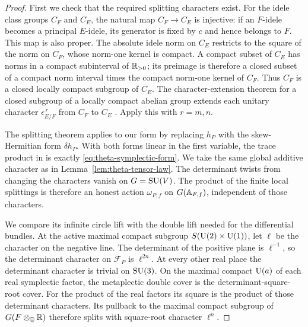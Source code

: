 \begin{proof}
First we check that the required splitting characters exist.
For the idele class groups \(C_F\) and \(C_E\), the natural map
\(C_F\to C_E\) is injective: if an \(F\)-idele becomes a principal
\(E\)-idele, its generator is fixed by \(c\) and hence belongs to
\(F\).  This map is also proper.  The absolute idele norm on
\(C_E\) restricts to the square of the norm on \(C_F\), whose
norm-one kernel is compact.  A compact subset of \(C_E\) has
norms in a compact subinterval of \(\mathbb{R}_{>0}\); its preimage is
therefore a closed subset of a compact norm interval times the
compact norm-one kernel of \(C_F\).  Thus \(C_F\) is a closed
locally compact subgroup of \(C_E\).  The character-extension
theorem for a closed subgroup of a locally compact abelian group
extends each unitary character \(\epsilon_{E/F}^{\,r}\) from
\(C_F\) to \(C_E\)
\cite[\S4.3, Corollary~4.42]{Folland2015}.  Apply this with
\(r=m,n\).

The splitting theorem applies to our form by replacing \(h_P\)
with the skew-Hermitian form \(\delta h_P\).  With both forms linear
in the first variable, the trace product in
\cite[\S\S2.1 and 3.1]{BoradeEtAl2025ToriPeriods} is exactly
\eqref{eq:theta-symplectic-form}.  We take the same global additive
character as in Lemma~\ref{lem:theta-tensor-law}.  The determinant twists from
changing the characters vanish on \(G=\operatorname{SU}(V)\).  The product of
the finite local splittings is therefore an honest action
\(\omega_{P,f}\) on \(G(\mathbb{A}_{F,f})\), independent of those
characters.

We compare its infinite circle lift with the double lift needed
for the differential bundles.  At the active maximal compact
subgroup \(S(\operatorname{U}(2)\times\operatorname{U}(1))\), let \(\ell\) be the character
on the negative line.  The determinant of the positive plane is
\(\ell^{-1}\), so the determinant character on
\(\mathcal F_P\) is \(\ell^{2n}\).  At every other real place
the determinant character is trivial on \(\operatorname{SU}(3)\).  On the
maximal compact \(\operatorname{U}(a)\) of each real symplectic factor, the
metaplectic double cover is the determinant-square-root cover.
For the product of the real factors its square is the product of
those determinant characters.  Its pullback to the maximal
compact subgroup of \(G(F\otimes_{\mathbb{Q}}\mathbb{R})\) therefore splits with
square-root character \(\ell^n\).


\end{proof}
